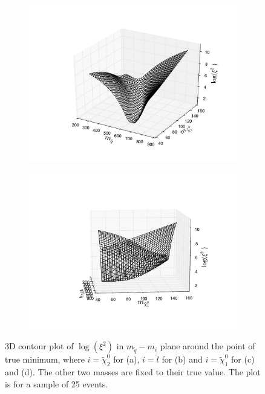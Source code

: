 \documentclass[twoside,english]{uiofysmaster}
\begin{document}
\begin{figure}[hbt]
	\begin{subfigure}[b]{0.49\textwidth}
		\includegraphics[width=\textwidth]{figures/3D_plot_xisquared_25_herwig_events_squark-chi1.pdf} 
		\caption{}
		\label{fig:3D_masses3}
	\end{subfigure}
	\begin{subfigure}[b]{0.49\textwidth}
		\includegraphics[width=\textwidth]{figures/3D_plot_xisquared_25_herwig_events_squark-chi1_rotated.pdf} 
		\caption{}
		\label{fig:3D_masses4}
	\end{subfigure}
	\caption{3D contour plot of $\log(\xi^2)$ in $m_{\tilde q}-m_i$ plane around the point of true minimum, where $i=\tilde \chi_2^0$ for (a), $i=\tilde l$ for (b) and $i=\tilde \chi_1^0$ for (c) and (d). The other two masses are fixed to their true value. The plot is for a sample of 25 events.}
	\label{fig:3D_masses}
\end{figure}
\end{document}
